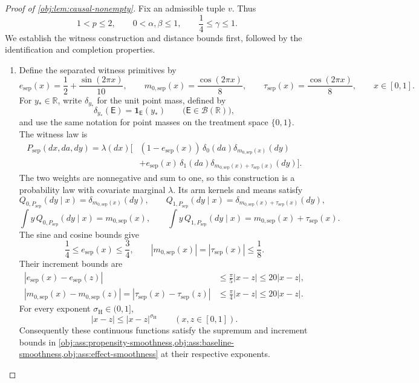 \begin{proof}[Proof of \cref{obj:lem:causal-nonempty}]
Fix an admissible tuple \(v\). Thus
\[
1<p\le2,\qquad
0<\alpha,\beta\le1,\qquad
\frac14\le\gamma\le1.
\]
We establish the witness construction and distance bounds first, followed by the identification and completion properties.

\begin{enumerate}
\item Define the separated witness primitives by
\[
e_{\mathrm{sep}}(x)=\frac12+\frac{\sin(2\pi x)}{10},
\qquad
m_{0,\mathrm{sep}}(x)=\frac{\cos(2\pi x)}8,
\qquad
\tau_{\mathrm{sep}}(x)=\frac{\cos(2\pi x)}8,
\qquad x\in[0,1].
\]
For \(y_\ast\in\mathbb R\), write \(\delta_{y_\ast}\) for the unit point mass, defined by
\[
\delta_{y_\ast}(\mathsf E)=\mathbf 1_{\mathsf E}(y_\ast)
\qquad
\bigl(\mathsf E\in\mathcal B(\mathbb R)\bigr),
\]
and use the same notation for point masses on the treatment space \(\{0,1\}\).
The witness law is
\[
\begin{aligned}
P_{\mathrm{sep}}(dx,da,dy)
=\lambda(dx)\bigl[
 &(1-e_{\mathrm{sep}}(x))\,
 \delta_0(da)\delta_{m_{0,\mathrm{sep}}(x)}(dy)\\
 &+e_{\mathrm{sep}}(x)\,
 \delta_1(da)\delta_{m_{0,\mathrm{sep}}(x)+\tau_{\mathrm{sep}}(x)}(dy)
\bigr].
\end{aligned}
\]
The two weights are nonnegative and sum to one, so this construction is a probability law with covariate marginal \(\lambda\). Its arm kernels and means satisfy
\[
Q_{0,P_{\mathrm{sep}}}(dy\mid x)
=\delta_{m_{0,\mathrm{sep}}(x)}(dy),
\qquad
Q_{1,P_{\mathrm{sep}}}(dy\mid x)
=\delta_{m_{0,\mathrm{sep}}(x)+\tau_{\mathrm{sep}}(x)}(dy),
\]
\[
\int y\,Q_{0,P_{\mathrm{sep}}}(dy\mid x)=m_{0,\mathrm{sep}}(x),
\qquad
\int y\,Q_{1,P_{\mathrm{sep}}}(dy\mid x)
=m_{0,\mathrm{sep}}(x)+\tau_{\mathrm{sep}}(x).
\]
The sine and cosine bounds give
\[
\frac14\le e_{\mathrm{sep}}(x)\le\frac34,
\qquad
|m_{0,\mathrm{sep}}(x)|=|\tau_{\mathrm{sep}}(x)|\le\frac18.
\]
Their increment bounds are
\[
\begin{aligned}
|e_{\mathrm{sep}}(x)-e_{\mathrm{sep}}(z)|
&\le\frac{\pi}{5}|x-z|
\le20|x-z|,\\
|m_{0,\mathrm{sep}}(x)-m_{0,\mathrm{sep}}(z)|
=|\tau_{\mathrm{sep}}(x)-\tau_{\mathrm{sep}}(z)|
&\le\frac{\pi}{4}|x-z|
\le20|x-z|.
\end{aligned}
\]
For every exponent \(\sigma_{\mathrm H}\in(0,1]\),
\[
|x-z|\le |x-z|^{\sigma_{\mathrm H}}
\qquad(x,z\in[0,1]).
\]
Consequently these continuous functions satisfy the supremum and increment bounds in
\cref{obj:ass:propensity-smoothness,obj:ass:baseline-smoothness,obj:ass:effect-smoothness}
at their respective exponents.


\end{enumerate}
\end{proof}
